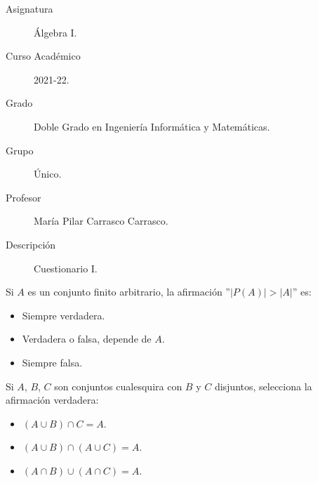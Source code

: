 \documentclass[12pt]{article}
\newcounter{ejercicio}[section] %
\newcounter{ejercicio}
\begin{document}

    
    

    
    \begin{description}
        \item[Asignatura] Álgebra I.
        \item[Curso Académico] 2021-22.
        \item[Grado] Doble Grado en Ingeniería Informática y Matemáticas.
        \item[Grupo] Único.
        \item[Profesor] María Pilar Carrasco Carrasco.
        \item[Descripción] Cuestionario I.
    
    \end{description}
    \newpage
    
    \begin{ejercicio}
        Si $A$ es un conjunto finito arbitrario, la afirmación ''$|P(A)| > |A|$'' es:
        \begin{itemize}
            \item Siempre verdadera.
            \item Verdadera o falsa, depende de $A$.
            \item Siempre falsa.
        \end{itemize}
    \end{ejercicio}

    \begin{ejercicio}
        Si $A$, $B$, $C$ son conjuntos cualesquira con $B$ y $C$ disjuntos, selecciona la afirmación verdadera:
        \begin{itemize}
            \item $(A \cup B)\cap C = A$.
            \item $(A \cup B)\cap (A \cup C)=A$.
            \item $(A\cap B)\cup(A \cap C)=A$.
        \end{itemize}
    \end{ejercicio}
\end{document}
